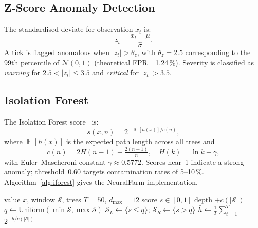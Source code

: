 \documentclass[journal,10pt,twocolumn]{IEEEtran}
\DeclareMathOperator{\E}{\mathbb{E}}
\begin{document}
\subsection{Z-Score Anomaly Detection}

The standardised deviate for observation $x_t$ is:
\begin{equation}
  z_t = \frac{x_t - \mu}{\hat\sigma}.
  \label{eq:zscore}
\end{equation}
A tick is flagged anomalous when $|z_t|>\theta_z$, with
$\theta_z{=}2.5$ corresponding to the 99th percentile of
$\mathcal{N}(0,1)$ (theoretical FPR\,=\,1.24\,\%).
Severity is classified as \emph{warning} for $2.5{<}|z_t|{\le}3.5$
and \emph{critical} for $|z_t|{>}3.5$.

\subsection{Isolation Forest}

The Isolation Forest score~\cite{Liu2008} is:
\begin{equation}
  s(x,n) = 2^{-\,\E[h(x)]/c(n)},
  \label{eq:ifscore}
\end{equation}
where $\E[h(x)]$ is the expected path length across all trees and
\begin{equation}
  c(n) = 2H(n-1) - \tfrac{2(n-1)}{n},
  \quad H(k) = \ln k + \gamma,
  \label{eq:cn}
\end{equation}
with Euler--Mascheroni constant $\gamma{\approx}0.5772$.
Scores near~1 indicate a strong anomaly; threshold~0.60 targets
contamination rates of 5--10\,\%.
Algorithm~\ref{alg:iforest} gives the NeuralFarm implementation.

\begin{algorithm}[t]
\caption{NeuralFarm Isolation Forest Scoring}
\label{alg:iforest}
\begin{algorithmic}[1]
\footnotesize
\Require value $x$, window $\mathcal{S}$, trees $T{=}50$,
         $d_{\max}{=}12$
\Ensure score $s\in[0,1]$
    \State \Return depth $+ c(|\mathcal{S}|)$
  \EndIf
  \State $q \gets \mathrm{Uniform}(\min\mathcal{S},\max\mathcal{S})$
  \State $\mathcal{S}_L\gets\{s{\le}q\}$; $\mathcal{S}_R\gets\{s{>}q\}$
  \State \Return {}
\EndFunction
\State $\bar h \gets \tfrac{1}{T}\sum_{t=1}^{T}$
\State \Return $2^{-\bar h/c(|\mathcal{S}|)}$
\end{algorithmic}
\end{algorithm}
\end{document}
